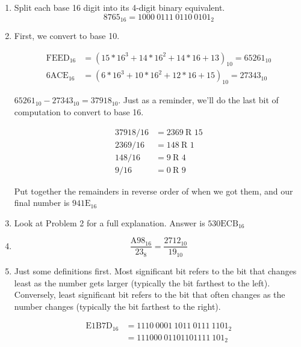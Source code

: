 \documentclass[12pt]{article}
\begin{document}
\begin{enumerate}

\item
Split each base 16 digit into its 4-digit binary equivalent.
\begin{equation*}
8765_{16} = \boxed{1000~0111~0110~0101_{2}}
\end{equation*}

\item
First, we convert to base 10.

\begin{align*}
\text{FEED}_{16} & = (15 * 16^3 + 14 * 16^2 + 14 * 16 + 13)_{10} = 65261_{10}\\
\text{6ACE}_{16} & = (6 * 16^3 + 10 * 16^2 + 12 * 16 + 15)_{10} = 27343_{10}
\end{align*}

$65261_{10} - 27343_{10} = 37918_{10}$.
Just as a reminder, we'll do the last bit of computation to convert to base 16. 

\begin{align*}
37918/16 &= 2369~\text{R 15}\\
2369/16 &= 148~\text{R 1}\\
148/16 &= 9~\text{R 4}\\
9/16 &= 0~\text{R 9}
\end{align*}

Put together the remainders in reverse order of when we got them, and our final number is $\boxed{\text{941E}_{16}}$

\item
Look at Problem 2 for a full explanation. Answer is $\boxed{\text{530ECB}_{16}}$

\item
\begin{equation*}
\frac{\text{A98}_{16}}{23_{8}} =  \boxed{\frac{\text{2712}_{10}}{19_{10}}}
\end{equation*}

\item
Just some definitions first. 
Most significant bit refers to the bit that changes least as the number gets larger 
(typically the bit farthest to the left). 
Conversely, least significant bit refers to the bit that often changes as the number changes
(typically the bit farthest to the right).

\begin{align*}
\text{E1B7D}_{16} &= 1110~0001~1011~0111~1101_2\\
&= 111000~01101101111~101_2
\end{align*}


\end{enumerate}
\end{document}
